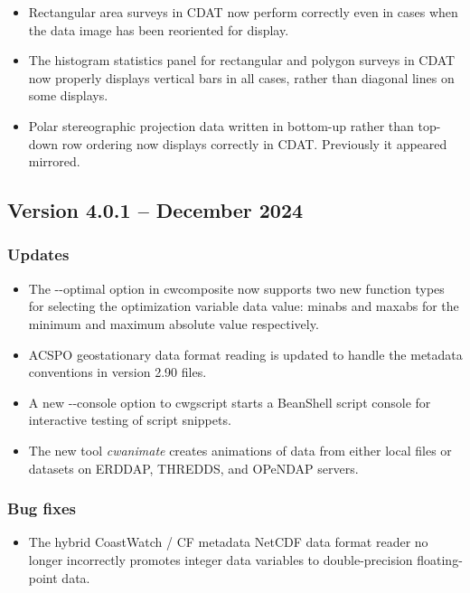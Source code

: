 \begin{itemize}
\item Rectangular area surveys in CDAT now perform correctly even in cases
when the data image has been reoriented for display.

\item The histogram statistics panel for rectangular and polygon surveys in
CDAT now properly displays vertical bars in all cases, rather than diagonal
lines on some displays.

\item Polar stereographic projection data written in bottom-up rather
than top-down row ordering now displays correctly in CDAT.  Previously
it appeared mirrored.

\end{itemize}


\subsection*{Version 4.0.1 -- December 2024}

\subsubsection*{ Updates}

\begin{itemize}

\item The -{-}optimal option in cwcomposite now supports two new function
types for selecting the optimization variable data value: minabs and maxabs
for the minimum and maximum absolute value respectively.

\item ACSPO geostationary data format reading is updated to handle the metadata
conventions in version 2.90 files.

\item A new -{-}console option to cwgscript starts a BeanShell script console
for interactive testing of script snippets.

\item The new tool {\em cwanimate} creates animations of data from either local
files or datasets on ERDDAP, THREDDS, and OPeNDAP servers.

\end{itemize}

\subsubsection*{ Bug fixes}
\begin{itemize}

\item The hybrid CoastWatch / CF metadata NetCDF data format reader no 
longer incorrectly promotes integer data variables to double-precision 
floating-point data.

\end{itemize}

